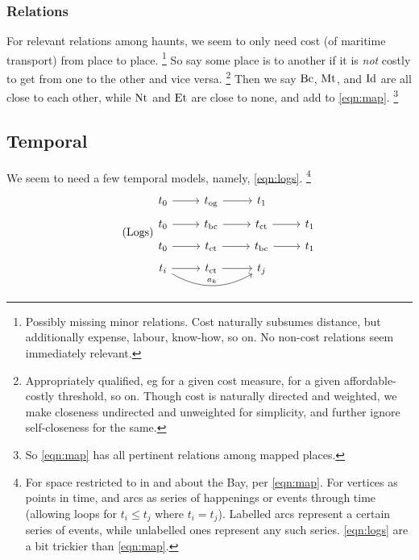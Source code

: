 		\subsubsection{Relations}
		For relevant relations among haunts, we seem to only need cost (of maritime transport) from place to place.%
		\footnote{Possibly missing minor relations. Cost naturally subsumes distance, but additionally expense, labour, know-how, so on. No non-cost relations seem immediately relevant.}
		So say some place is  to another if it is \emph{not} costly to get from one to the other and vice versa.%
		\footnote{Appropriately qualified, eg for a given cost measure, for a given affordable-costly threshold, so on. Though cost is naturally directed and weighted, we make closeness undirected and unweighted for simplicity, and further ignore self-closeness for the same.}
		Then we say \(\operatorname{Bc}\), \(\operatorname{Mt}\), and \(\operatorname{Id}\) are all close to each other, while \(\operatorname{Nt}\) and \(\operatorname{Et}\) are close to none, and add to \ref{eqn:map}.%
		\footnote{So \ref{eqn:map} has all pertinent relations among mapped places.} %
	\subsection{Temporal}
	\label{ss:temporal}
		We seem to need a few temporal models, namely, \ref{eqn:logs}.%
		\footnote{For space restricted to in and about the Bay, per \ref{eqn:map}. For vertices as points in time, and arcs as series of happenings or events through time (allowing loops for \(t_i\leq t_j\) where \(t_i=t_j\)). Labelled arcs represent a certain series of events, while unlabelled ones represent any such series. \ref{eqn:logs} are a bit trickier than \ref{eqn:map}.}
		\begin{equation}
		\tag{Logs}
		\label{eqn:logs}
		\begin{tikzcd}[row sep=tiny]
		t_0 \rar &t_{\og} \rar &t_1\\
		t_0 \rar &t_{\buc} \rar &t_{\ct} \rar &t_1\\
		t_0 \rar &t_{\ct} \rar &t_{\buc} \rar &t_1\\
		t_i \rar \ar[rr,bend right,"a_k"] &t_{\ct} \rar &t_j
		\end{tikzcd}
		\end{equation}
		
